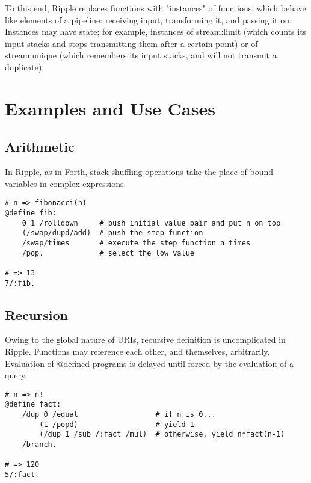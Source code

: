 \documentclass[runningheads]{llncs}
\begin{document}
To this end, Ripple replaces functions with "instances" of functions, which behave like elements of a pipeline: receiving input, transforming it, and passing it on.  Instances may have state; for example, instances of stream:limit (which counts its input stacks and stops transmitting them after a certain point) or of stream:unique (which remembers its input stacks, and will not transmit a duplicate).





\section{Examples and Use Cases}

\subsection{Arithmetic}
In Ripple, as in Forth, stack shuffling operations take the place of bound variables in complex expressions.
\begin{verbatim}
# n => fibonacci(n)
@define fib:
    0 1 /rolldown     # push initial value pair and put n on top
    (/swap/dupd/add)  # push the step function
    /swap/times       # execute the step function n times
    /pop.             # select the low value

# => 13
7/:fib.
\end{verbatim}


\subsection{Recursion}
Owing to the global nature of URIs, recursive definition is uncomplicated in Ripple.  Functions may reference each other, and themselves, arbitrarily.  Evaluation of @defined programs is delayed until forced by the evaluation of a query.
\begin{verbatim}
# n => n!
@define fact:
    /dup 0 /equal                  # if n is 0...
        (1 /popd)                  # yield 1
        (/dup 1 /sub /:fact /mul)  # otherwise, yield n*fact(n-1)
    /branch.

# => 120
5/:fact.
\end{verbatim}
\end{document}
